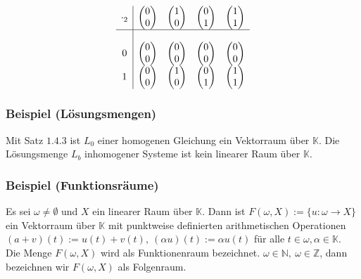 \[\begin{array}{c|cccc}\cdot _2 & \begin{pmatrix}0\\ 0\end{pmatrix} & \begin{pmatrix} 1 \\ 0 \end{pmatrix} & \begin{pmatrix}0 \\ 1\end{pmatrix} & \begin{pmatrix}1\\ 1\end{pmatrix} \\ \hline \\ 0 &\begin{pmatrix}0 \\ 0\end{pmatrix} &\begin{pmatrix}0\\ 0\end{pmatrix} &\begin{pmatrix}0\\ 0\end{pmatrix} & \begin{pmatrix}0\\ 0\end{pmatrix} \\ 1 &\begin{pmatrix}0 \\ 0\end{pmatrix} &\begin{pmatrix}1\\ 0\end{pmatrix} &\begin{pmatrix}0\\ 1\end{pmatrix} & \begin{pmatrix}1\\ 1\end{pmatrix}\end{array}\]
\subsubsection{Beispiel (Lösungsmengen)}
Mit Satz $1.4.3$ ist $L_0$ einer homogenen Gleichung ein Vektorraum über $\mathbb{K}$.  Die Lösungsmenge $L_b$ inhomogener Systeme ist kein linearer Raum über $\mathbb{K}$.
\subsubsection{Beispiel (Funktionsräume)}
Es sei $\omega \not= \emptyset$ und $X$ ein linearer Raum über $\mathbb{K}$.  Dann ist $F(\omega ,X):=\{ u:\omega \rightarrow X\}$ ein Vektorraum über $\mathbb{K}$ mit punktweise definierten arithmetischen Operationen $(a+v)(t) := u(t)+v(t),\ (\alpha u)(t):= \alpha u(t)$ für alle $t\in\omega ,\alpha \in\mathbb{K}$.\\
Die Menge $F(\omega ,X)$ wird als Funktionenraum bezeichnet.  $\omega\in\mathbb{N},\ \omega\in\mathbb{Z}$, dann bezeichnen wir $F(\omega ,X)$ als Folgenraum.
